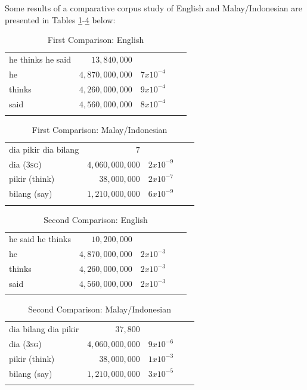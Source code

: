 \documentclass[output=paper,colorlinks,citecolor=brown
]{langscibook}
\begin{document}
Some results of a comparative corpus study of English and Malay/Indonesian are presented in Tables \ref{tab:first-english}-\ref{tab:second-malay} below:

\begin{table}[hbt!]
\caption{First Comparison: English}
\label{tab:first-english}
 \begin{tabularx}{.8\textwidth}{X rrrr}
 \lsptoprule
 he thinks he said & $13,840,000$ & {} \\
 he & $4,870,000,000$ & $7 x 10^{-4}$ \\
 thinks & $4,260,000,000$ & $9 x 10^{-4}$\\
 said & $4,560,000,000$ & $8 x 10^{-4}$\\
 \lspbottomrule
 \end{tabularx}
\end{table}

\begin{table}[hbt!]
\caption{First Comparison: Malay/Indonesian}
\label{tab:first-malay}
 \begin{tabularx}{.8\textwidth}{X rrrr}
 \lsptoprule
 dia pikir dia bilang & $7$ & {} \\
 dia (3\textsc{sg}) & $4,060,000,000$ & $2 x 10^{-9}$ \\
 pikir (think) & $38,000,000$ & $2 x 10^{-7}$\\
 bilang (say) & $1,210,000,000$ & $6 x 10^{-9}$\\
 \lspbottomrule
 \end{tabularx}
\end{table}

\begin{table}[hbt!]
\caption{Second Comparison: English}
\label{tab:second-english}
 \begin{tabularx}{.8\textwidth}{X rrrr}
 \lsptoprule
 he said he thinks & $10,200,000$ & {} \\
 he & $4,870,000,000$ & $2 x 10^{-3}$ \\
 thinks & $4,260,000,000$ & $2 x 10^{-3}$\\
 said & $4,560,000,000$ & $2 x 10^{-3}$\\
 \lspbottomrule
 \end{tabularx}
\end{table}

\begin{table}[hbt!]
\caption{Second Comparison: Malay/Indonesian}
\label{tab:second-malay}
 \begin{tabularx}{.8\textwidth}{X rrrr}
 \lsptoprule
 dia bilang dia pikir & $37,800$ & {} \\
 dia (3\textsc{sg}) & $4,060,000,000$ & $9 x 10^{-6}$ \\
 pikir (think) & $38,000,000$ & $1 x 10^{-3}$\\
 bilang (say) & $1,210,000,000$ & $3 x 10^{-5}$\\
 \lspbottomrule
 \end{tabularx}
\end{table}
\end{document}
